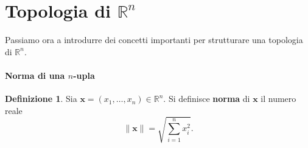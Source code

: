 \documentclass{article}
\theoremstyle{plain}
\theoremstyle{definition}
\newtheorem{defn}{Definizione}[section]
\theoremstyle{remark}
\begin{document}
% 
% 
% 
% 
% 
% 
% 

\section{Topologia di $\mathbb{R}^n$}

\vspace{10pt}

Passiamo ora a introdurre dei concetti importanti per strutturare una topologia di $\mathbb{R}^n$.

\vspace{10pt}

\paragraph{Norma di una $n$-upla}
\begin{bxthm}
\begin{defn}
    Sia $\mathbf{x}=(x_1,\ldots,x_n)\in\mathbb{R}^n$. Si definisce \textbf{norma} di $\mathbf{x}$ il numero reale 
    \[\|\mathbf{x}\|=\sqrt{\sum_{i=1}^{n}x_i^2}.\]
\end{defn}
\end{bxthm}

\vspace{10pt}
\end{document}
